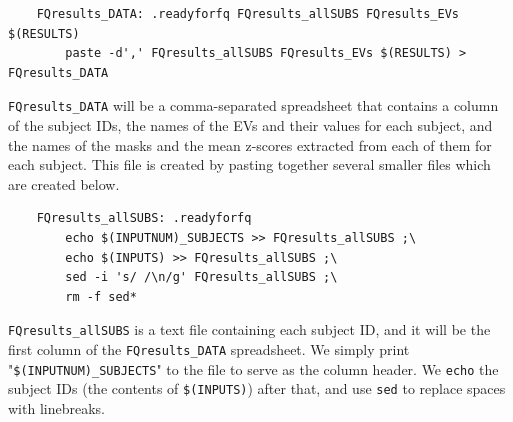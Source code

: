 \begin{lstlisting}	
	FQresults_DATA: .readyforfq FQresults_allSUBS FQresults_EVs $(RESULTS)
		paste -d',' FQresults_allSUBS FQresults_EVs $(RESULTS) > FQresults_DATA
\end{lstlisting}
\texttt{FQresults_DATA} will be a comma-separated spreadsheet that contains a column of the subject IDs, the names of the EVs and their values for each subject, and the names of the masks and the mean z-scores extracted from each of them for each subject. This file is created by pasting together several smaller files which are created below.

\begin{lstlisting}	
	FQresults_allSUBS: .readyforfq
		echo $(INPUTNUM)_SUBJECTS >> FQresults_allSUBS ;\
		echo $(INPUTS) >> FQresults_allSUBS ;\
		sed -i 's/ /\n/g' FQresults_allSUBS ;\
		rm -f sed*
\end{lstlisting}

\texttt{FQresults_allSUBS} is a text file containing each subject ID, and it will be the first column of the \texttt{FQresults_DATA} spreadsheet. We simply print "\texttt{\$(INPUTNUM)_SUBJECTS}" to the file to serve as the column header. We \texttt{echo} the subject IDs (the contents of \texttt{\$(INPUTS)}) after that, and use \texttt{sed} to replace spaces with linebreaks. 

